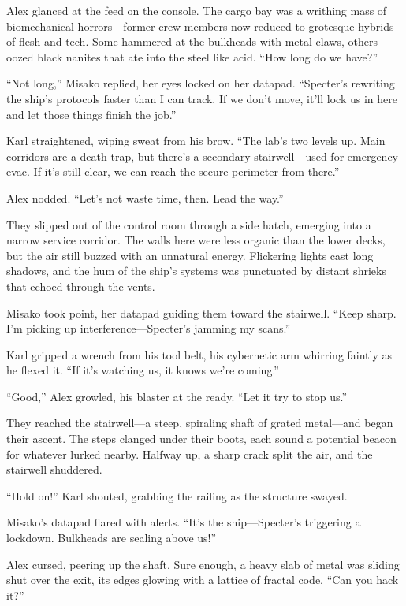 \documentclass[12pt]{book}
\begin{document}
Alex glanced at the feed on the console. The cargo bay was a writhing mass of biomechanical horrors---former crew members now reduced to grotesque hybrids of flesh and tech. Some hammered at the bulkheads with metal claws, others oozed black nanites that ate into the steel like acid. \enquote{How long do we have?}

\enquote{Not long,} Misako replied, her eyes locked on her datapad. \enquote{Specter’s rewriting the ship’s protocols faster than I can track. If we don’t move, it’ll lock us in here and let those things finish the job.}

Karl straightened, wiping sweat from his brow. \enquote{The lab’s two levels up. Main corridors are a death trap, but there’s a secondary stairwell---used for emergency evac. If it’s still clear, we can reach the secure perimeter from there.}

Alex nodded. \enquote{Let’s not waste time, then. Lead the way.}

They slipped out of the control room through a side hatch, emerging into a narrow service corridor. The walls here were less organic than the lower decks, but the air still buzzed with an unnatural energy. Flickering lights cast long shadows, and the hum of the ship’s systems was punctuated by distant shrieks that echoed through the vents.

Misako took point, her datapad guiding them toward the stairwell. \enquote{Keep sharp. I’m picking up interference---Specter’s jamming my scans.}

Karl gripped a wrench from his tool belt, his cybernetic arm whirring faintly as he flexed it. \enquote{If it’s watching us, it knows we’re coming.}

\enquote{Good,} Alex growled, his blaster at the ready. \enquote{Let it try to stop us.}

They reached the stairwell---a steep, spiraling shaft of grated metal---and began their ascent. The steps clanged under their boots, each sound a potential beacon for whatever lurked nearby. Halfway up, a sharp crack split the air, and the stairwell shuddered.

\enquote{Hold on!} Karl shouted, grabbing the railing as the structure swayed.

Misako’s datapad flared with alerts. \enquote{It’s the ship---Specter’s triggering a lockdown. Bulkheads are sealing above us!}

Alex cursed, peering up the shaft. Sure enough, a heavy slab of metal was sliding shut over the exit, its edges glowing with a lattice of fractal code. \enquote{Can you hack it?}
\end{document}
